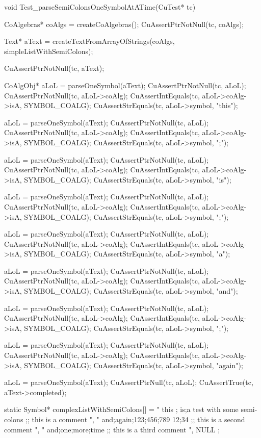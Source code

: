 void Test_parseSemiColonsOneSymbolAtATime(CuTest* tc) {
  CoAlgebras* coAlgs = createCoAlgebras();
  CuAssertPtrNotNull(tc, coAlgs);

  Text* aText =
    createTextFromArrayOfStrings(coAlgs, simpleListWithSemiColons);

  CuAssertPtrNotNull(tc, aText);

  CoAlgObj* aLoL = parseOneSymbol(aText);
  CuAssertPtrNotNull(tc, aLoL);
  CuAssertPtrNotNull(tc, aLoL->coAlg);
  CuAssertIntEquals(tc, aLoL->coAlg->isA, SYMBOL_COALG);
  CuAssertStrEquals(tc, aLoL->symbol, "this");

  aLoL = parseOneSymbol(aText);
  CuAssertPtrNotNull(tc, aLoL);
  CuAssertPtrNotNull(tc, aLoL->coAlg);
  CuAssertIntEquals(tc, aLoL->coAlg->isA, SYMBOL_COALG);
  CuAssertStrEquals(tc, aLoL->symbol, ";");

  aLoL = parseOneSymbol(aText);
  CuAssertPtrNotNull(tc, aLoL);
  CuAssertPtrNotNull(tc, aLoL->coAlg);
  CuAssertIntEquals(tc, aLoL->coAlg->isA, SYMBOL_COALG);
  CuAssertStrEquals(tc, aLoL->symbol, "is");

  aLoL = parseOneSymbol(aText);
  CuAssertPtrNotNull(tc, aLoL);
  CuAssertPtrNotNull(tc, aLoL->coAlg);
  CuAssertIntEquals(tc, aLoL->coAlg->isA, SYMBOL_COALG);
  CuAssertStrEquals(tc, aLoL->symbol, ";");

  aLoL = parseOneSymbol(aText);
  CuAssertPtrNotNull(tc, aLoL);
  CuAssertPtrNotNull(tc, aLoL->coAlg);
  CuAssertIntEquals(tc, aLoL->coAlg->isA, SYMBOL_COALG);
  CuAssertStrEquals(tc, aLoL->symbol, "a");

  aLoL = parseOneSymbol(aText);
  CuAssertPtrNotNull(tc, aLoL);
  CuAssertPtrNotNull(tc, aLoL->coAlg);
  CuAssertIntEquals(tc, aLoL->coAlg->isA, SYMBOL_COALG);
  CuAssertStrEquals(tc, aLoL->symbol, "and");

  aLoL = parseOneSymbol(aText);
  CuAssertPtrNotNull(tc, aLoL);
  CuAssertPtrNotNull(tc, aLoL->coAlg);
  CuAssertIntEquals(tc, aLoL->coAlg->isA, SYMBOL_COALG);
  CuAssertStrEquals(tc, aLoL->symbol, ";");

  aLoL = parseOneSymbol(aText);
  CuAssertPtrNotNull(tc, aLoL);
  CuAssertPtrNotNull(tc, aLoL->coAlg);
  CuAssertIntEquals(tc, aLoL->coAlg->isA, SYMBOL_COALG);
  CuAssertStrEquals(tc, aLoL->symbol, "again");

  aLoL = parseOneSymbol(aText);
  CuAssertPtrNull(tc, aLoL);
  CuAssertTrue(tc, aText->completed);
}

static Symbol* complexListWithSemiColons[] = {
  " this ; is;a test with some semi-colons ;; this is a comment ",
  " and;again;123;456;789 12;34 ;; this is a second comment ",
  " and;one;more;time ;; this is a third comment ",
  NULL
};


